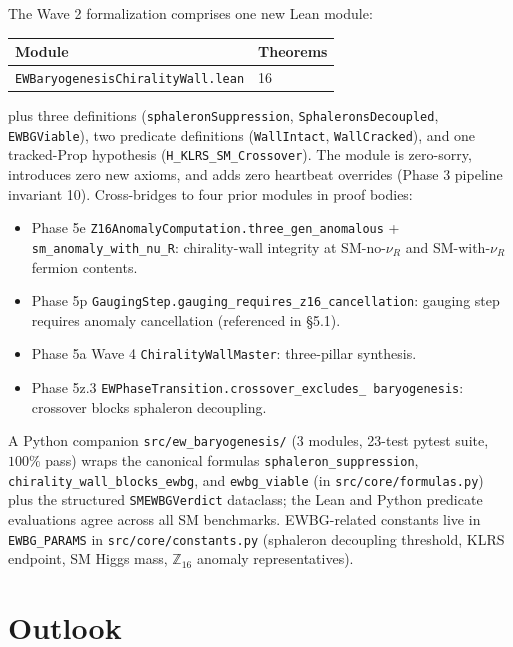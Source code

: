 \documentclass[aps,prl,twocolumn,showpacs,superscriptaddress,nofootinbib]{revtex4-2}
\newcommand{\Zsixteen}{\mathbb{Z}_{16}}
\begin{document}
The Wave 2 formalization comprises one new Lean module:
\begin{center}
\begin{tabular}{ll}
\toprule
Module & Theorems \\
\midrule
\texttt{EWBaryogenesisChiralityWall.lean} & 16 \\
\bottomrule
\end{tabular}
\end{center}
plus three definitions
(\texttt{sphaleronSuppression}, \texttt{SphaleronsDecoupled},
\texttt{EWBGViable}), two predicate definitions (\texttt{WallIntact},
\texttt{WallCracked}), and one tracked-Prop hypothesis
(\texttt{H\_KLRS\_SM\_Crossover}). The module is zero-sorry,
introduces zero new axioms, and adds zero heartbeat overrides
(Phase 3 pipeline invariant 10). Cross-bridges to four prior modules
in proof bodies:
\begin{itemize}
\item Phase 5e \texttt{Z16AnomalyComputation.three\_gen\_anomalous}
+ \texttt{sm\_anomaly\_with\_nu\_R}: chirality-wall integrity at
SM-no-$\nu_R$ and SM-with-$\nu_R$ fermion contents.
\item Phase 5p \texttt{GaugingStep.gauging\_requires\_z16\_cancellation}:
gauging step requires anomaly cancellation (referenced in §5.1).
\item Phase 5a Wave 4 \texttt{ChiralityWallMaster}: three-pillar
synthesis.
\item Phase 5z.3 \texttt{EWPhaseTransition.crossover\_excludes\_
baryogenesis}: crossover blocks sphaleron decoupling.
\end{itemize}

A Python companion \texttt{src/ew\_baryogenesis/} (3 modules, 23-test
pytest suite, $100\%$ pass) wraps the canonical formulas
\texttt{sphaleron\_suppression}, \texttt{chirality\_wall\_blocks\_ewbg},
and \texttt{ewbg\_viable} (in \texttt{src/core/formulas.py}) plus the
structured \texttt{SMEWBGVerdict} dataclass; the Lean and Python
predicate evaluations agree across all SM benchmarks. EWBG-related
constants live in \texttt{EWBG\_PARAMS} in \texttt{src/core/constants.py}
(sphaleron decoupling threshold, KLRS endpoint, SM Higgs mass,
$\Zsixteen$ anomaly representatives).

\section{Outlook}
\label{sec:outlook}
\end{document}
